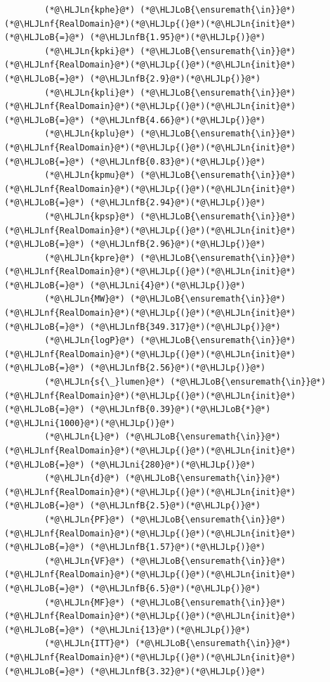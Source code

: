 \documentclass[12pt,a4paper]{article}
\newcommand{\HLJLn}[1]{#1}
\newcommand{\HLJLnf}[1]{\textcolor[RGB]{66,102,213}{#1}}
\newcommand{\HLJLnfB}[1]{\textcolor[RGB]{59,151,46}{#1}}
\newcommand{\HLJLni}[1]{\textcolor[RGB]{59,151,46}{#1}}
\newcommand{\HLJLoB}[1]{\textcolor[RGB]{102,102,102}{\textbf{#1}}}
\newcommand{\HLJLp}[1]{#1}
\begin{document}
\begin{lstlisting}
        (*@\HLJLn{kphe}@*) (*@\HLJLoB{\ensuremath{\in}}@*) (*@\HLJLnf{RealDomain}@*)(*@\HLJLp{(}@*)(*@\HLJLn{init}@*) (*@\HLJLoB{=}@*) (*@\HLJLnfB{1.95}@*)(*@\HLJLp{)}@*)
        (*@\HLJLn{kpki}@*) (*@\HLJLoB{\ensuremath{\in}}@*) (*@\HLJLnf{RealDomain}@*)(*@\HLJLp{(}@*)(*@\HLJLn{init}@*) (*@\HLJLoB{=}@*) (*@\HLJLnfB{2.9}@*)(*@\HLJLp{)}@*)
        (*@\HLJLn{kpli}@*) (*@\HLJLoB{\ensuremath{\in}}@*) (*@\HLJLnf{RealDomain}@*)(*@\HLJLp{(}@*)(*@\HLJLn{init}@*) (*@\HLJLoB{=}@*) (*@\HLJLnfB{4.66}@*)(*@\HLJLp{)}@*)
        (*@\HLJLn{kplu}@*) (*@\HLJLoB{\ensuremath{\in}}@*) (*@\HLJLnf{RealDomain}@*)(*@\HLJLp{(}@*)(*@\HLJLn{init}@*) (*@\HLJLoB{=}@*) (*@\HLJLnfB{0.83}@*)(*@\HLJLp{)}@*)
        (*@\HLJLn{kpmu}@*) (*@\HLJLoB{\ensuremath{\in}}@*) (*@\HLJLnf{RealDomain}@*)(*@\HLJLp{(}@*)(*@\HLJLn{init}@*) (*@\HLJLoB{=}@*) (*@\HLJLnfB{2.94}@*)(*@\HLJLp{)}@*)
        (*@\HLJLn{kpsp}@*) (*@\HLJLoB{\ensuremath{\in}}@*) (*@\HLJLnf{RealDomain}@*)(*@\HLJLp{(}@*)(*@\HLJLn{init}@*) (*@\HLJLoB{=}@*) (*@\HLJLnfB{2.96}@*)(*@\HLJLp{)}@*)
        (*@\HLJLn{kpre}@*) (*@\HLJLoB{\ensuremath{\in}}@*) (*@\HLJLnf{RealDomain}@*)(*@\HLJLp{(}@*)(*@\HLJLn{init}@*) (*@\HLJLoB{=}@*) (*@\HLJLni{4}@*)(*@\HLJLp{)}@*)
        (*@\HLJLn{MW}@*) (*@\HLJLoB{\ensuremath{\in}}@*) (*@\HLJLnf{RealDomain}@*)(*@\HLJLp{(}@*)(*@\HLJLn{init}@*) (*@\HLJLoB{=}@*) (*@\HLJLnfB{349.317}@*)(*@\HLJLp{)}@*)
        (*@\HLJLn{logP}@*) (*@\HLJLoB{\ensuremath{\in}}@*) (*@\HLJLnf{RealDomain}@*)(*@\HLJLp{(}@*)(*@\HLJLn{init}@*) (*@\HLJLoB{=}@*) (*@\HLJLnfB{2.56}@*)(*@\HLJLp{)}@*)
        (*@\HLJLn{s{\_}lumen}@*) (*@\HLJLoB{\ensuremath{\in}}@*) (*@\HLJLnf{RealDomain}@*)(*@\HLJLp{(}@*)(*@\HLJLn{init}@*) (*@\HLJLoB{=}@*) (*@\HLJLnfB{0.39}@*)(*@\HLJLoB{*}@*)(*@\HLJLni{1000}@*)(*@\HLJLp{)}@*)
        (*@\HLJLn{L}@*) (*@\HLJLoB{\ensuremath{\in}}@*) (*@\HLJLnf{RealDomain}@*)(*@\HLJLp{(}@*)(*@\HLJLn{init}@*) (*@\HLJLoB{=}@*) (*@\HLJLni{280}@*)(*@\HLJLp{)}@*)
        (*@\HLJLn{d}@*) (*@\HLJLoB{\ensuremath{\in}}@*) (*@\HLJLnf{RealDomain}@*)(*@\HLJLp{(}@*)(*@\HLJLn{init}@*) (*@\HLJLoB{=}@*) (*@\HLJLnfB{2.5}@*)(*@\HLJLp{)}@*)
        (*@\HLJLn{PF}@*) (*@\HLJLoB{\ensuremath{\in}}@*) (*@\HLJLnf{RealDomain}@*)(*@\HLJLp{(}@*)(*@\HLJLn{init}@*) (*@\HLJLoB{=}@*) (*@\HLJLnfB{1.57}@*)(*@\HLJLp{)}@*)
        (*@\HLJLn{VF}@*) (*@\HLJLoB{\ensuremath{\in}}@*) (*@\HLJLnf{RealDomain}@*)(*@\HLJLp{(}@*)(*@\HLJLn{init}@*) (*@\HLJLoB{=}@*) (*@\HLJLnfB{6.5}@*)(*@\HLJLp{)}@*)
        (*@\HLJLn{MF}@*) (*@\HLJLoB{\ensuremath{\in}}@*) (*@\HLJLnf{RealDomain}@*)(*@\HLJLp{(}@*)(*@\HLJLn{init}@*) (*@\HLJLoB{=}@*) (*@\HLJLni{13}@*)(*@\HLJLp{)}@*)
        (*@\HLJLn{ITT}@*) (*@\HLJLoB{\ensuremath{\in}}@*) (*@\HLJLnf{RealDomain}@*)(*@\HLJLp{(}@*)(*@\HLJLn{init}@*) (*@\HLJLoB{=}@*) (*@\HLJLnfB{3.32}@*)(*@\HLJLp{)}@*)

\end{lstlisting}
\end{document}
